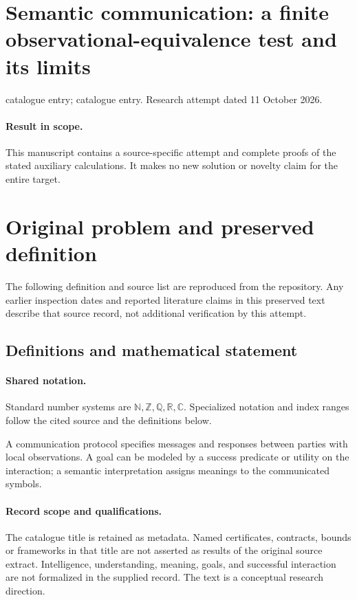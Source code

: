 \documentclass[11pt]{article}
\begin{document}
\section*{Semantic communication: a finite observational-equivalence test and its limits}
\noindent catalogue entry; catalogue entry. Research attempt dated 11 October 2026.
\paragraph{Result in scope.}This manuscript contains a source-specific attempt and complete proofs of the stated auxiliary calculations. It makes no new solution or novelty claim for the entire target.
\section{Original problem and preserved definition}
The following definition and source list are reproduced from the repository. Any earlier inspection dates and reported literature claims in this preserved text describe that source record, not additional verification by this attempt.
\subsection{Definitions and mathematical statement}

\paragraph{Shared notation.}Standard number systems are $\mathbb N,\mathbb Z,\mathbb Q,\mathbb R,\mathbb C$. Specialized notation and index ranges follow the cited source and the definitions below.


A communication protocol specifies messages and responses between parties with local observations. A goal can be modeled by a success predicate or utility on the interaction; a semantic interpretation assigns meanings to the communicated symbols.
\paragraph{Record scope and qualifications.}
The catalogue title is retained as metadata. Named certificates, contracts, bounds or frameworks in that title are not asserted as results of the original source extract.
Intelligence, understanding, meaning, goals, and successful interaction are not formalized in the supplied record. The text is a conceptual research direction.
\end{document}
